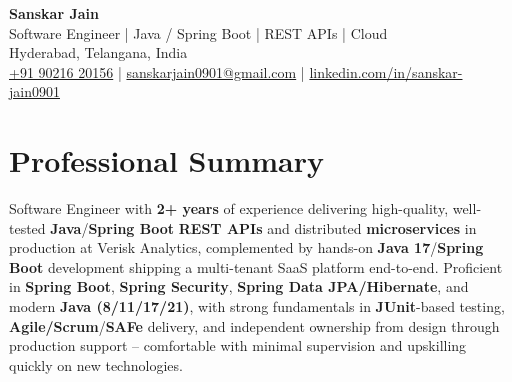 \documentclass[a4paper,10pt]{article}
\begin{document}
\begin{center}
    {\LARGE \textbf{Sanskar Jain}} \\
    \vspace{2pt}
    Software Engineer \;|\; Java / Spring Boot \;|\; REST APIs \;|\; Cloud \\
    \vspace{2pt}
    Hyderabad, Telangana, India \\
    \href{tel:+919021620156}{+91 90216 20156} \;|\;
    \href{mailto:sanskarjain0901@gmail.com}{sanskarjain0901@gmail.com} \;|\;
    \href{https://www.linkedin.com/in/sanskar-jain0901/}{linkedin.com/in/sanskar-jain0901}
\end{center}

\vspace{1pt}

\section*{Professional Summary}
Software Engineer with \textbf{2+ years} of experience delivering high-quality, well-tested \textbf{Java}/\textbf{Spring Boot} \textbf{REST APIs} and distributed \textbf{microservices} in production at Verisk Analytics, complemented by hands-on \textbf{Java 17}/\textbf{Spring Boot} development shipping a multi-tenant SaaS platform end-to-end.
Proficient in \textbf{Spring Boot}, \textbf{Spring Security}, \textbf{Spring Data JPA/Hibernate}, and modern \textbf{Java (8/11/17/21)}, with strong fundamentals in \textbf{JUnit}-based testing, \textbf{Agile/Scrum}/\textbf{SAFe} delivery, and independent ownership from design through production support -- comfortable with minimal supervision and upskilling quickly on new technologies.
\end{document}
